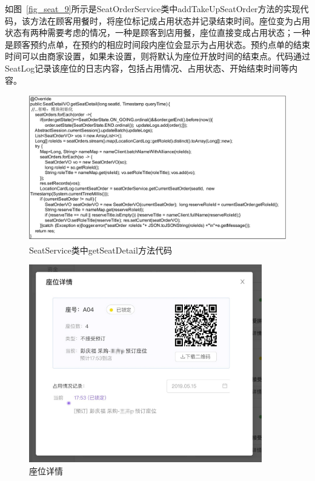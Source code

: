 如图~\ref{fig_seat_9}所示是SeatOrderService类中addTakeUpSeatOrder方法的实现代码，该方法在顾客用餐时，将座位标记成占用状态并记录结束时间。座位变为占用状态有两种需要考虑的情况，一种是顾客到店用餐，座位直接变成占用状态；一种是顾客预约点单，在预约的相应时间段内座位会显示为占用状态。预约点单的结束时间可以由商家设置，如果未设置，则将默认为座位开放时间的结束点。代码通过SeatLog记录该座位的日志内容，包括占用情况、占用状态、开始结束时间等内容。

\begin{figure}[htbp!]
    \centering
    \includegraphics[width=\linewidth]{FIGs/chapter4/10.pdf}
    \caption{SeatService类中getSeatDetail方法代码}\label{fig_seat_10}
\end{figure}

\begin{figure}[htbp!]
    \centering
    \includegraphics[width=4in]{FIGs/chapter4/seat_detail.pdf}
    \caption{座位详情}\label{fig_seat_detail}
\end{figure}

